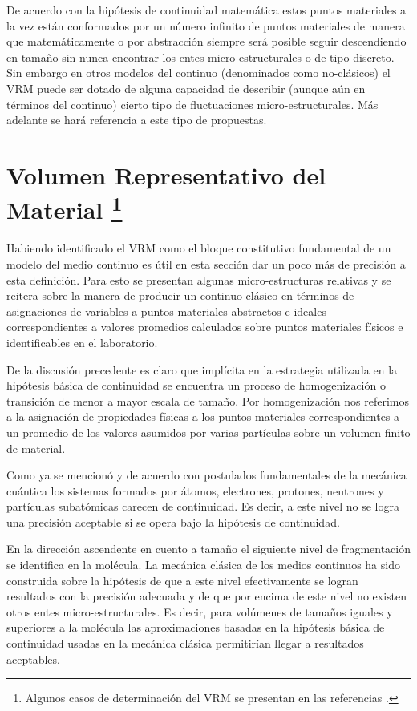 \documentclass[../notas medios.tex]{subfiles}
\begin{document}
De acuerdo con la hipótesis de continuidad matemática estos puntos materiales a la vez están conformados por un número infinito de puntos materiales de manera que matemáticamente o por abstracción siempre será posible seguir descendiendo en tamaño sin nunca encontrar los entes micro-estructurales o de tipo discreto.  Sin embargo en otros modelos del continuo (denominados como no-clásicos) el VRM puede ser dotado de alguna capacidad de describir (aunque aún en términos del continuo) cierto tipo de fluctuaciones micro-estructurales.  Más adelante se hará referencia a este tipo de propuestas.

\section*{Volumen Representativo del Material \footnote{Algunos casos de determinación del VRM se presentan en las referencias \cite{bonda1996effect,bonda1992deformation}.}}


Habiendo identificado el VRM como el bloque constitutivo fundamental de un
modelo del medio continuo es útil en esta sección dar un poco más de precisión
a esta definición.  Para esto se presentan algunas micro-estructuras relativas y se reitera sobre la manera de producir un continuo clásico en términos de asignaciones de variables a puntos materiales abstractos e ideales correspondientes a valores promedios calculados sobre puntos materiales físicos e identificables en el laboratorio.

De la discusión precedente es claro que implícita en la estrategia utilizada en la hipótesis básica de continuidad se encuentra un proceso de homogenización o transición de menor a mayor escala de tamaño.  Por homogenización nos referimos a la asignación de propiedades físicas a los puntos materiales correspondientes a un promedio de los valores asumidos por varias partículas sobre un volumen finito de material.

Como ya se mencionó y de acuerdo con postulados fundamentales de la mecánica cuántica los sistemas formados por átomos, electrones, protones, neutrones y partículas subatómicas carecen de continuidad.  Es decir, a este nivel no se logra una precisión aceptable si se opera bajo la hipótesis de continuidad.

En la dirección ascendente en cuento a tamaño el siguiente nivel de fragmentación se identifica en la molécula.  La mecánica clásica de los medios continuos ha sido construida sobre la hipótesis de que a este nivel efectivamente se logran resultados con la precisión adecuada y de que por encima de este nivel no existen otros entes micro-estructurales.  Es decir, para volúmenes de tamaños iguales y superiores a la molécula las aproximaciones basadas en la hipótesis básica de continuidad usadas en la mecánica clásica permitirían llegar a resultados aceptables.
\end{document}
